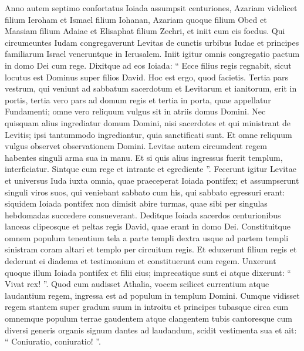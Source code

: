 \begin{biblechapter}
\begin{biblechapter}
\begin{biblechapter}
\begin{biblechapter}
\begin{biblechapter}
\begin{biblechapter}
\begin{biblechapter}
\begin{biblechapter}
\begin{biblechapter}
\begin{biblechapter}
\begin{biblechapter}
\begin{biblechapter}
\begin{biblechapter}
\begin{biblechapter}
\begin{biblechapter}
\begin{biblechapter}
\begin{biblechapter}
\begin{biblechapter}
\begin{biblechapter}
\begin{biblechapter}
\begin{biblechapter}
\begin{biblechapter}
\begin{biblechapter}
\verse Anno autem septimo confortatus Ioiada assumpsit centuriones, Azariam videlicet filium Ieroham et Ismael filium Iohanan, Azariam quoque filium Obed et Maasiam filium Adaiae et Elisaphat filium Zechri, et iniit cum eis foedus. 
\verse Qui circumeuntes Iudam congregaverunt Levitas de cunctis urbibus Iudae et principes familiarum Israel veneruntque in Ierusalem. 
\verse Iniit igitur omnis congregatio pactum in domo Dei cum rege. Dixitque ad eos Ioiada: “ Ecce filius regis regnabit, sicut locutus est Dominus super filios David. 
\verse Hoc est ergo, quod facietis. 
\verse Tertia pars vestrum, qui veniunt ad sabbatum sacerdotum et Levitarum et ianitorum, erit in portis, tertia vero pars ad domum regis et tertia in porta, quae appellatur Fundamenti; omne vero reliquum vulgus sit in atriis domus Domini. 
\verse Nec quisquam alius ingrediatur domum Domini, nisi sacerdotes et qui ministrant de Levitis; ipsi tantummodo ingrediantur, quia sanctificati sunt. Et omne reliquum vulgus observet observationem Domini. 
\verse Levitae autem circumdent regem habentes singuli arma sua in manu. Et si quis alius ingressus fuerit templum, interficiatur. Sintque cum rege et intrante et egrediente ”.
 \verse Fecerunt igitur Levitae et universus Iuda iuxta omnia, quae praeceperat Ioiada pontifex; et assumpserunt singuli viros suos, qui veniebant sabbato cum his, qui sabbato egressuri erant: siquidem Ioiada pontifex non dimisit abire turmas, quae sibi per singulas hebdomadas succedere consueverant. 
\verse Deditque Ioiada sacerdos centurionibus lanceas clipeosque et peltas regis David, quae erant in domo Dei. 
\verse Constituitque omnem populum tenentium tela a parte templi dextra usque ad partem templi sinistram coram altari et templo per circuitum regis. 
\verse Et eduxerunt filium regis et dederunt ei diadema et testimonium et constituerunt eum regem. Unxerunt quoque illum Ioiada pontifex et filii eius; imprecatique sunt ei atque dixerunt: “ Vivat rex! ”.
 \verse Quod cum audisset Athalia, vocem scilicet currentium atque laudantium regem, ingressa est ad populum in templum Domini. 
\verse Cumque vidisset regem stantem super gradum suum in introitu et principes tubasque circa eum omnemque populum terrae gaudentem atque clangentem tubis cantoresque cum diversi generis organis signum dantes ad laudandum, scidit vestimenta sua et ait: “ Coniuratio, coniuratio! ”.

\end{biblechapter}
\end{biblechapter}
\end{biblechapter}
\end{biblechapter}
\end{biblechapter}
\end{biblechapter}
\end{biblechapter}
\end{biblechapter}
\end{biblechapter}
\end{biblechapter}
\end{biblechapter}
\end{biblechapter}
\end{biblechapter}
\end{biblechapter}
\end{biblechapter}
\end{biblechapter}
\end{biblechapter}
\end{biblechapter}
\end{biblechapter}
\end{biblechapter}
\end{biblechapter}
\end{biblechapter}
\end{biblechapter}
